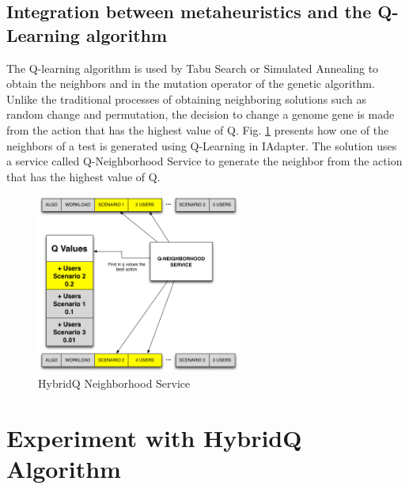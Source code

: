 \documentclass[espaco=umemeio,chapter=TITLE,twoside,openright]{abnt}
\begin{document}
\subsection{Integration between metaheuristics and the Q-Learning algorithm }

The Q-learning algorithm is used by Tabu Search or Simulated Annealing to obtain the neighbors and in the mutation operator of the genetic algorithm. Unlike the traditional processes of obtaining neighboring solutions such as random change and permutation, the decision to change a genome gene is made from the action that has the highest value of Q. Fig. \ref{fig:neighservice} presents how one of the neighbors of a test is generated using Q-Learning in IAdapter. The solution uses a service called Q-Neighborhood Service to generate the neighbor from the action that has the highest value of Q.

\begin{figure}[h!]
\center
\includegraphics[width=0.6\textwidth]{./images/q-neighborservice.png}
\caption{HybridQ Neighborhood Service}
\label{fig:neighservice}
\end{figure}

\section{Experiment with HybridQ Algorithm}
\end{document}
